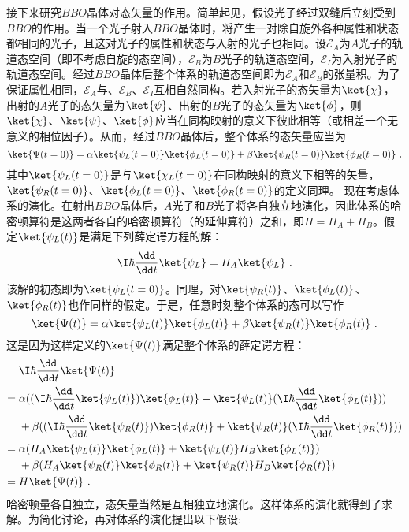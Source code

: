 接下来研究$BBO$晶体对态矢量的作用。简单起见，假设光子经过双缝后立刻受到$BBO$的作用。当一个光子射入$BBO$晶体时，将产生一对除自旋外各种属性和状态都相同的光子，且这对光子的属性和状态与入射的光子也相同。设$\mathscr{E}_A$为$A$光子的轨道态空间（即不考虑自旋的态空间），$\mathscr{E}_B$为$B$光子的轨道态空间，$\mathscr{E}_I$为入射光子的轨道态空间。经过$BBO$晶体后整个体系的轨道态空间即为$\mathscr{E}_A$和$\mathscr{E}_B$的张量积。为了保证属性相同，$\mathscr{E}_A$与、$\mathscr{E}_B$、$\mathscr{E}_I$互相自然同构。若入射光子的态矢量为$\ket{\chi}$，出射的$A$光子的态矢量为$\ket{\psi}$、出射的$B$光子的态矢量为$\ket{\phi}$，则$\ket{\chi}$、$\ket{\psi}$、$\ket{\phi}$应当在同构映射的意义下彼此相等（或相差一个无意义的相位因子）。从而，经过$BBO$晶体后，整个体系的态矢量应当为
\begin{equation}
\ket{\Psi(t=0)} =\alpha\ket{\psi_L(t=0)}\ket{\phi_L(t=0)}+\beta\ket{\psi_R(t=0)}\ket{\phi_R(t=0)}~.
\end{equation}
其中$\ket{\psi_L(t=0)}$是与$\ket{\chi_L(t=0)}$在同构映射的意义下相等的矢量，$\ket{\psi_R(t=0)}$、$\ket{\phi_L(t=0)}$、$\ket{\phi_R(t=0)}$的定义同理。
现在考虑体系的演化。在射出$BBO$晶体后，$A$光子和$B$光子将各自独立地演化，因此体系的哈密顿算符是这两者各自的哈密顿算符（的延伸算符）之和，即$H=H_A+H_B$。假定$\ket{\psi_L(t)}$是满足下列薛定谔方程的解：
\begin{equation}
\I\hbar\frac{\dd}{\dd t}\ket{\psi_L} =H_A\ket{\psi_L}~.
\end{equation}
该解的初态即为$\ket{\psi_L(t=0)}$。同理，对$\ket{\psi_R(t)}$、$\ket{\phi_L(t)}$、$\ket{\phi_R(t)}$也作同样的假定。于是，任意时刻整个体系的态可以写作
\begin{equation}
\ket{\Psi(t)} =\alpha\ket{\psi_L(t)}\ket{\phi_L(t)}+\beta\ket{\psi_R(t)}\ket{\phi_R(t)}~.
\end{equation}
这是因为这样定义的$\ket{\Psi(t)}$满足整个体系的薛定谔方程：
\begin{align}
&\I\hbar\frac{\dd}{\dd t}\ket{\Psi(t)} \notag \\
={}&\alpha((\I\hbar\frac{\dd}{\dd t}\ket{\psi_L(t)})\ket{\phi_L(t)}+\ket{\psi_L(t)}(\I\hbar\frac{\dd}{\dd t}\ket{\phi_L(t)})) \notag \\
&+\beta((\I \hbar\frac{\dd}{\dd t}\ket{\psi_R(t)})\ket{\phi_R(t)}+\ket{\psi_R(t)}(\I\hbar\frac{\dd}{\dd t}\ket{\phi_R(t)})) \notag \\
={}&\alpha(H_A\ket{\psi_L(t)}\ket{\phi_L(t)}+\ket{\psi_L(t)} H_B\ket{\phi_L(t)}) \notag \\
&+\beta(H_A\ket{\psi_R(t)}\ket{\phi_R(t)}+\ket{\psi_R(t)} H_B\ket{\phi_R(t)}) \notag \\
={}&H\ket{\Psi(t)}~.
\end{align}
哈密顿量各自独立，态矢量当然是互相独立地演化。这样体系的演化就得到了求解。为简化讨论，再对体系的演化提出以下假设:

